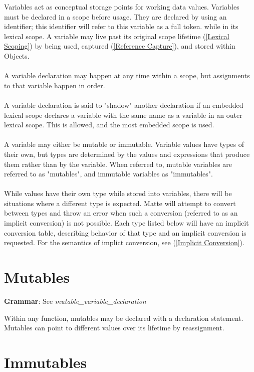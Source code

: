\documentclass[12pt,letterpaper]{report}
\begin{document}
Variables act as conceptual storage points for working data values. Variables must be declared in a scope before usage.
They are declared by using an identifier; this identifier will refer to this variable as a full token. 
while in its lexical scope. A variable may live past its original scope lifetime (\autoref{Lexical Scoping}) by being used, captured (\autoref{Reference Capture}), and stored within Objects.
\\\\
A variable declaration may happen at any time within a scope, but assignments to that variable happen in order.
\\\\
A variable declaration is said to "shadow" another declaration if an embedded lexical scope declares a variable with
the same name as a variable in an outer lexical scope. This is allowed, and the most embedded scope is used.
\\\\
A variable may either be mutable or immutable. Variable values have types of their own, but 
types are determined by the values and expressions that produce them rather than by the 
variable. When referred to, mutable variables are referred to as "mutables", and immutable variables as "immutables".
\\\\
While values have their own type while stored into variables, there will be situations where a different 
type is expected. Matte will attempt to convert between types and throw an error when such a conversion (referred to as an implicit conversion) is not possible.
Each type listed below will have an implicit conversion table, describing behavior of that type and an implicit conversion is requested.
For the semantics of implict conversion, see (\autoref{Implicit Conversion}).


\section{Mutables}\label{Mutables}

\textbf{Grammar}: See \textit{mutable\_variable\_declaration}

Within any function, mutables may be declared with a declaration statement.
Mutables can point to different values over its lifetime by reassignment.
    




\section{Immutables}\label{Immutables}
\end{document}

